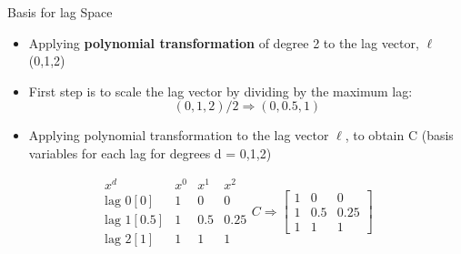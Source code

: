 \documentclass[english]{beamer}
\begin{document}
\begin{frame}{Basis for lag Space}
    \begin{itemize}
        \item Applying \textbf{polynomial transformation} of degree 2 to the lag vector, \(\ell\)(0,1,2)
        \item First step is to scale the lag vector by dividing by the maximum lag:
        \[
        (0,1,2)/2 \Rightarrow (0, 0.5, 1)
        \]
        \item Applying polynomial transformation to the lag vector \(\ell\), to obtain C (basis variables for each lag for degrees d = 0,1,2)
    \end{itemize}
    \vspace{0.5cm}
\[
\begin{array}{c|c|c|c}
    x^d & x^0 & x^1 & x^2 \\ \hline
    \text{lag 0}[0] & 1  & 0   & 0   \\
    \text{lag 1}[0.5] & 1  & 0.5 & 0.25 \\
    \text{lag 2}[1] & 1  & 1   & 1   
\end{array}
C \Rightarrow 
\begin{bmatrix}
1 & 0 & 0 \\
1 & 0.5 & 0.25 \\
1 & 1 & 1
\end{bmatrix}
\]
\end{frame}
\end{document}

